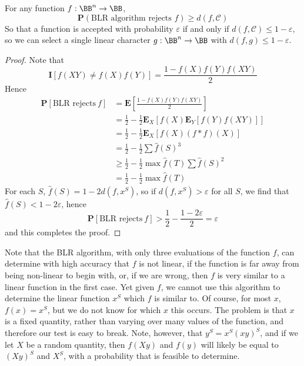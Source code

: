 \begin{theorem}
    For any function $f: \BB^n \to \BB$,
    \[ \mathbf{P}(\text{BLR algorithm rejects $f$}) \geq d(f, \mathcal{C}) \]
    So that a function is accepted with probability $\varepsilon$ if and only if $d(f,\mathcal{C}) \leq 1 - \varepsilon$, so we can select a single linear character $g: \BB^n \to \BB$ with $d(f,g) \leq 1 - \varepsilon$.
\end{theorem}
\begin{proof}
    Note that
    \[ \mathbf{I}[f(XY) \neq f(X)f(Y)] = \frac{1 - f(X)f(Y)f(XY)}{2} \]
    Hence
    \begin{align*}
        \mathbf{P}[\text{BLR rejects}\ f] &= \mathbf{E} \left[ \frac{1 - f(X)f(Y)f(XY)}{2} \right]\\
        &= \frac{1}{2} - \frac{1}{2} \mathbf{E}_X[f(X) \mathbf{E}_Y[f(Y) f(XY)]]\\
        &= \frac{1}{2} - \frac{1}{2} \mathbf{E}_X[f(X) (f * f)(X)]\\
        &= \frac{1}{2} - \frac{1}{2} \sum \widehat{f}(S)^3\\
        &\geq \frac{1}{2} - \frac{1}{2} \max \widehat{f}(T) \sum \widehat{f}(S)^2\\
        &= \frac{1}{2} - \frac{1}{2} \max \widehat{f}(T)
    \end{align*}
    For each $S$, $\widehat{f}(S) = 1 - 2 d(f, x^S)$, so if $d(f,x^S) > \varepsilon$ for all $S$, we find that $\widehat{f}(S) < 1 - 2 \varepsilon$, hence
    \[ \mathbf{P}[\text{BLR rejects}\ f] > \frac{1}{2} - \frac{1 - 2\varepsilon}{2} = \varepsilon \]
    and this completes the proof.
\end{proof}

Note that the BLR algorithm, with only three evaluations of the function $f$, can determine with high accuracy that $f$ is not linear, if the function is far away from being non-linear to begin with, or, if we are wrong, then $f$ is very similar to a linear function in the first case. Yet given $f$, we cannot use this algorithm to determine the linear function $x^S$ which $f$ is similar to. Of course, for most $x$, $f(x) = x^S$, but we do not know for which $x$ this occurs. The problem is that $x$ is a fixed quantity, rather than varying over many values of the function, and therefore our test is easy to break. Note, however, that $y^S = x^S (xy)^S$, and if we let $X$ be a random quantity, then $f(Xy)$ and $f(y)$ will likely be equal to $(Xy)^S$ and $X^S$, with a probability that is feasible to determine.

